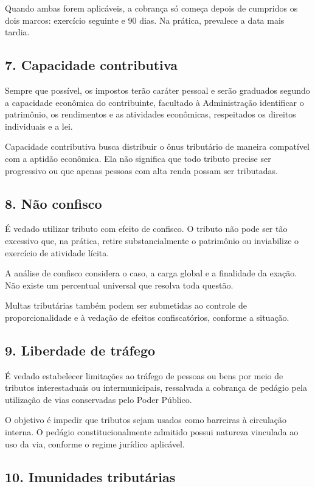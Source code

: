 \documentclass[11pt,a4paper]{article}
\begin{document}
Quando ambas forem aplicáveis, a cobrança só começa depois de cumpridos os dois marcos: exercício seguinte e 90 dias. Na prática, prevalece a data mais tardia.

\subsection*{7. Capacidade contributiva}

Sempre que possível, os impostos terão caráter pessoal e serão graduados segundo a capacidade econômica do contribuinte, facultado à Administração identificar o patrimônio, os rendimentos e as atividades econômicas, respeitados os direitos individuais e a lei.

Capacidade contributiva busca distribuir o ônus tributário de maneira compatível com a aptidão econômica. Ela não significa que todo tributo precise ser progressivo ou que apenas pessoas com alta renda possam ser tributadas.

\subsection*{8. Não confisco}

É vedado utilizar tributo com efeito de confisco. O tributo não pode ser tão excessivo que, na prática, retire substancialmente o patrimônio ou inviabilize o exercício de atividade lícita.

A análise de confisco considera o caso, a carga global e a finalidade da exação. Não existe um percentual universal que resolva toda questão.

Multas tributárias também podem ser submetidas ao controle de proporcionalidade e à vedação de efeitos confiscatórios, conforme a situação.

\subsection*{9. Liberdade de tráfego}

É vedado estabelecer limitações ao tráfego de pessoas ou bens por meio de tributos interestaduais ou intermunicipais, ressalvada a cobrança de pedágio pela utilização de vias conservadas pelo Poder Público.

O objetivo é impedir que tributos sejam usados como barreiras à circulação interna. O pedágio constitucionalmente admitido possui natureza vinculada ao uso da via, conforme o regime jurídico aplicável.

\subsection*{10. Imunidades tributárias}
\end{document}
